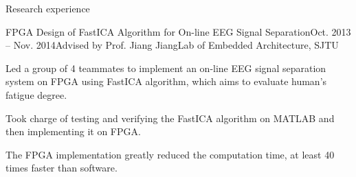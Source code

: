\documentclass{resume_ucla} %
\begin{document}
\begin{rSection}{Research experience}
\begin{rSubsection}{FPGA Design of FastICA Algorithm for On-line EEG Signal Separation}{Oct. 2013 -- Nov. 2014}{Advised by Prof. Jiang Jiang}{Lab of Embedded Architecture, SJTU}
\item Led a group of 4 teammates to implement an on-line EEG signal separation system on FPGA using FastICA algorithm, which aims to evaluate human's fatigue degree.
\item Took charge of testing and verifying the FastICA algorithm on MATLAB and then implementing it on FPGA. 
\item The FPGA implementation greatly reduced the computation time, at least 40 times faster than software.
\end{rSubsection}
\end{rSection}
\end{document}
